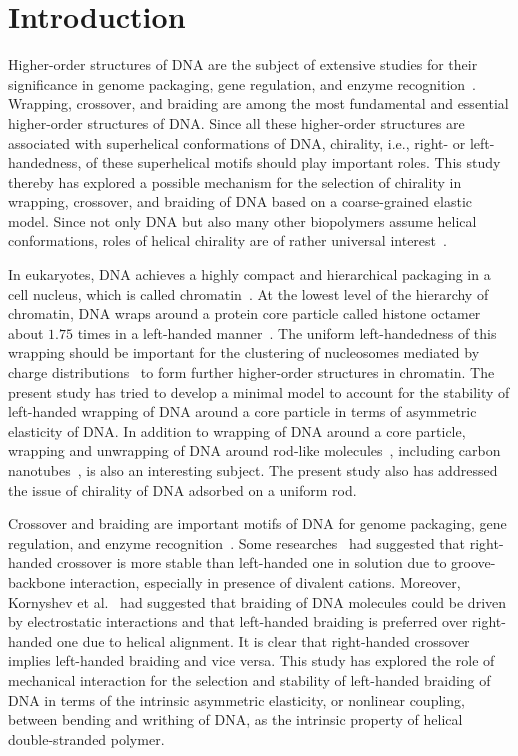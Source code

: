 \documentclass[a4paper,10pt]{article}
\begin{document}
\section{Introduction}
Higher-order structures of DNA are the subject of extensive studies for their significance in genome packaging, gene regulation, and enzyme recognition~\cite{1,2}.
Wrapping, crossover, and braiding are among the most fundamental and essential higher-order structures of DNA.
Since all these higher-order structures are associated with superhelical conformations of DNA, chirality, i.e., right- or left-handedness, of these superhelical motifs should play important roles.
This study thereby has explored a possible mechanism for the selection of chirality in wrapping, crossover, and braiding of DNA based on a coarse-grained elastic model.
Since not only DNA but also many other biopolymers assume helical conformations, roles of helical chirality are of rather universal interest~\cite{3}.

In eukaryotes, DNA achieves a highly compact and hierarchical packaging in a cell nucleus, which is called chromatin~\cite{10}.
At the lowest level of the hierarchy of chromatin, DNA wraps around a protein core particle called histone octamer about $1.75$ times in a left-handed manner~\cite{1,2}.
The uniform left-handedness of this wrapping should be important for the clustering of nucleosomes mediated by charge distributions~\cite{16} to form further higher-order structures in chromatin.
The present study has tried to develop a minimal model to account for the stability of left-handed wrapping of DNA around a core particle in terms of asymmetric elasticity of DNA.
In addition to wrapping of DNA around a core particle, wrapping and unwrapping of DNA around rod-like molecules~\cite{27}, including carbon nanotubes~\cite{rod_2}, is also an interesting subject.
The present study also has addressed the issue of chirality of DNA adsorbed on a uniform rod.

Crossover and braiding are important motifs of DNA for genome packaging, gene regulation, and enzyme recognition~\cite{br_1}.
Some researches~\cite{br_1, br_2, br_3} had suggested that right-handed crossover is more stable than left-handed one in solution due to groove-backbone interaction, especially in presence of divalent cations.
Moreover, Kornyshev et al.~\cite{br_4, br_5} had suggested that braiding of DNA molecules could be driven by electrostatic interactions and that left-handed braiding is preferred over right-handed one due to helical alignment.
It is clear that right-handed crossover implies left-handed braiding and vice versa.
This study has explored the role of mechanical interaction for the selection and stability of left-handed braiding of DNA in terms of the intrinsic asymmetric elasticity, or nonlinear coupling, between bending and writhing of DNA, as the intrinsic property of helical double-stranded polymer.
\end{document}
